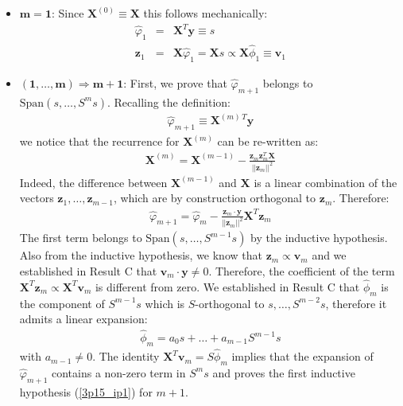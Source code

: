 \begin{itemize}
\item $ \mathbf{m = 1}$: Since $\mathbf{X}^{(0)} \equiv \mathbf{X}$ this follows mechanically:
\begin{eqnarray*}
\hat{\varphi}_1 & = & \mathbf{X}^T \mathbf{y} \equiv s\\
\mathbf{z}_1 & = & \mathbf{X} \hat{\varphi}_1 = \mathbf{X} s \propto \mathbf{X} \hat{\phi}_1 \equiv \mathbf{v}_1
\end{eqnarray*}
\item $\mathbf{(1, \ldots, m) \Rightarrow m + 1}$: First, we prove that $\hat{\varphi}_{m + 1}$ belongs to $\textrm{Span} \left( s, \ldots, S^m s \right)$. Recalling the definition:
\begin{eqnarray*}
\hat{\varphi}_{m + 1} \equiv \mathbf{X}^{(m) \, T} \mathbf{y}
\end{eqnarray*}
we notice that the recurrence for $\mathbf{X}^{(m)}$ can be re-written as:
\begin{eqnarray} \label{3p15_unroll}
\mathbf{X}^{(m)} = \mathbf{X}^{(m-1)} - \frac{ \mathbf{z}_m \mathbf{z}_m^T \mathbf{X}}{||\mathbf{z}_m||^2}
\end{eqnarray}
Indeed, the difference between $\mathbf{X}^{(m - 1)}$ and $\mathbf{X}$ is a linear combination of the vectors $\mathbf{z}_1, \ldots, \mathbf{z}_{m - 1}$, which are by 
construction orthogonal to $\mathbf{z}_m$. Therefore:
\begin{eqnarray*}
\hat{\varphi}_{m + 1} = \hat{\varphi}_{m} - \frac{\mathbf{z}_m \cdot \mathbf{y}}{|| \mathbf{z}_m||^2} \mathbf{X}^T \mathbf{z}_m
\end{eqnarray*}
The first term belongs to $\textrm{Span}\left( s, \ldots, S^{m - 1}s \right)$ by the inductive hypothesis. Also from the inductive hypothesis, we know that $\mathbf{z}_m \propto \mathbf{v}_m$ and we
established in Result C that $\mathbf{v}_m \cdot \mathbf{y} \neq 0$. Therefore, the coefficient of
the term $\mathbf{X}^T \mathbf{z}_m \propto \mathbf{X}^T \mathbf{v}_m $ is different
from zero. We established
in Result C that $\hat{\phi}_m$ is the component of $S^{m - 1} s$ which is $S$-orthogonal to $s, \ldots, S^{m - 2} s$, therefore it admits a linear expansion:
\begin{eqnarray*}
\hat{\phi}_m = a_0 s + \ldots + a_{m - 1} S^{m - 1}s
\end{eqnarray*}
with $a_{m -1} \neq 0$. The identity $\mathbf{X}^T \mathbf{v}_m = S \hat{\phi}_m$ implies that the
expansion of $\hat{\varphi}_{m + 1}$ contains a non-zero term in $S^m s$ and proves the first inductive hypothesis (\ref{3p15_ip1}) for $m + 1$.


\end{itemize}
